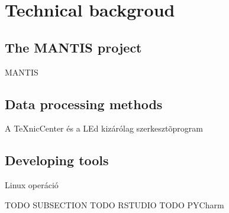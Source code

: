 \chapter{Technical backgroud}
\section{The MANTIS project}
MANTIS
\section{Data processing methods}
A TeXnicCenter és a LEd kizárólag szerkesztõprogram 

\section{Developing tools}
Linux operáció

TODO SUBSECTION
TODO RSTUDIO
TODO PYCharm